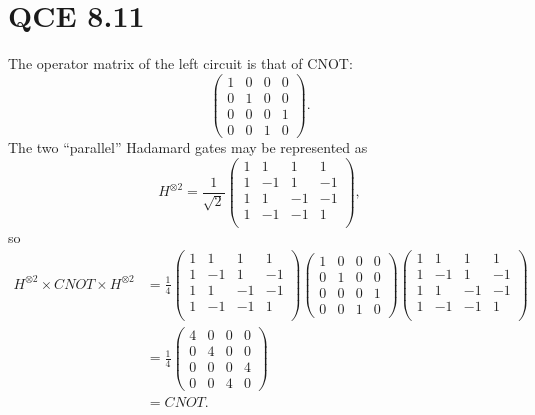 \documentclass[10pt]{article}
\begin{document}
\section*{QCE 8.11}
The operator matrix of the left circuit is that of CNOT:
\[
\begin{pmatrix}
1 & 0 & 0 & 0 \\
0 & 1 & 0 & 0 \\
0 & 0 & 0 & 1 \\
0 & 0 & 1 & 0
\end{pmatrix}.
\]
The two ``parallel'' Hadamard gates may be represented as
\[
H^{\otimes 2} = 
\frac{1}{\sqrt{2}}
\begin{pmatrix}
1 & 1   & 1   & 1 \\
1 & -1 & 1   & -1 \\
1 & 1   & -1 & -1 \\
1 & -1 & -1 & 1 \\
\end{pmatrix},
\]
so
\begin{align*}
H^{\otimes 2} \times CNOT \times H^{\otimes 2} &= 
\frac{1}{4}
\begin{pmatrix}
1 & 1   & 1   & 1 \\
1 & -1 & 1   & -1 \\
1 & 1   & -1 & -1 \\
1 & -1 & -1 & 1 \\
\end{pmatrix}
\begin{pmatrix}
1 & 0 & 0 & 0 \\
0 & 1 & 0 & 0 \\
0 & 0 & 0 & 1 \\
0 & 0 & 1 & 0
\end{pmatrix}
\begin{pmatrix}
1 & 1   & 1   & 1 \\
1 & -1 & 1   & -1 \\
1 & 1   & -1 & -1 \\
1 & -1 & -1 & 1 \\
\end{pmatrix} \\
&= 
\frac{1}{4}
\begin{pmatrix}
4 & 0 & 0 & 0 \\
0 & 4 & 0 & 0 \\
0 & 0 & 0 & 4 \\
0 & 0 & 4 & 0
\end{pmatrix} \\
&= CNOT.
\end{align*}
\end{document}
